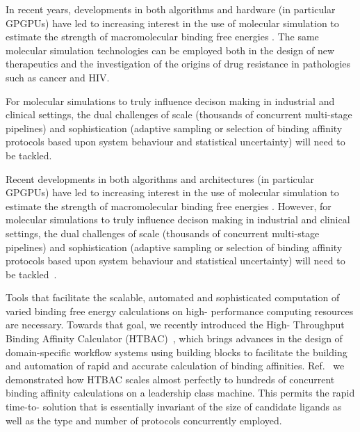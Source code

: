 In recent years, developments in both algorithms and hardware (in particular
GPGPUs) have led to increasing interest in the use of molecular simulation to
estimate the strength of macromolecular binding free energies
\cite{DeVivo2016}. The same molecular simulation technologies can be employed
both in the design of new therapeutics and the investigation of the origins of
drug resistance in pathologies such as cancer and HIV.

For molecular simulations to truly influence decison making in industrial and
clinical settings, the dual challenges of scale (thousands of concurrent
multi-stage pipelines) and sophistication (adaptive sampling or selection of
binding affinity protocols based upon system behaviour and statistical
uncertainty) will need to be tackled. 


Recent developments in both algorithms and architectures (in particular
GPGPUs) have led to increasing interest in the use of molecular simulation to
estimate the strength of macromolecular binding free energies
\cite{DeVivo2016}. However, for molecular simulations to truly influence
decison making in industrial and clinical settings, the dual challenges of
scale (thousands of concurrent multi-stage pipelines) and sophistication
(adaptive sampling or selection of binding affinity protocols based upon
system behaviour and statistical uncertainty) will need to be
tackled~\cite{XX}.


Tools that facilitate the scalable, automated and sophisticated computation of
varied binding free energy calculations on high- performance computing
resources are necessary. Towards that goal, we recently introduced the High-
Throughput Binding Affinity Calculator (HTBAC)~\cite{XX}, which brings
advances in the design of domain-specific workflow systems using building
blocks to facilitate the building and automation of rapid and accurate
calculation of binding affinities. Ref.~\cite{XX} we demonstrated how HTBAC
scales almost perfectly to hundreds of concurrent binding affinity
calculations on a leadership class machine. This permits the rapid time-to-
solution that is essentially invariant of the size of candidate ligands as
well as the type and number of protocols concurrently employed.

